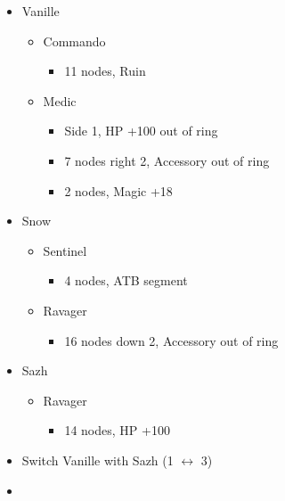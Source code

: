 \begin{paracol}{2}
\begin{menu}
	\begin{itemize}
		\crystarium
		\begin{itemize}
			\item Vanille
			      \begin{itemize}
				      \item Commando
				            \begin{itemize}
					            \item 11 nodes, Ruin
				            \end{itemize}
				      \item Medic
				            \begin{itemize}
					            \item Side 1, HP +100 out of ring
					            \item 7 nodes right 2, Accessory out of ring
					            \item 2 nodes, Magic +18
				            \end{itemize}
			      \end{itemize}
			\item Snow
			      \begin{itemize}
				      \item Sentinel
				            \begin{itemize}
					            \item 4 nodes, ATB segment
				            \end{itemize}
				      \item Ravager
				            \begin{itemize}
					            \item 16 nodes down 2, Accessory out of ring
				            \end{itemize}
			      \end{itemize}
			\item Sazh
			      \begin{itemize}
				      \item Ravager
				            \begin{itemize}
					            \item 14 nodes,  HP +100
				            \end{itemize}
			      \end{itemize}
		\end{itemize}
		\paradigm
		\begin{itemize}
			\item Switch Vanille with Sazh (1 $\leftrightarrow$ 3)
			\item \paradigmdeck{%
}
\end{itemize}
\end{itemize}
\end{menu}
\end{paracol}
